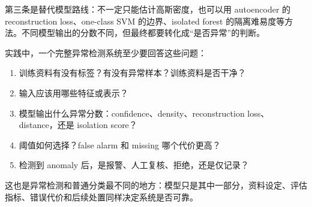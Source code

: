 \documentclass[a4paper]{article}
\begin{document}
第三条是替代模型路线：不一定只能估计高斯密度，也可以用 autoencoder 的 reconstruction loss、one-class SVM 的边界、isolated forest 的隔离难易度等方法。不同模型输出的分数不同，但最终都要转化成“是否异常”的判断。

实践中，一个完整异常检测系统至少要回答这些问题：
\begin{enumerate}
    \item 训练资料有没有标签？有没有异常样本？训练资料是否干净？
    \item 输入应该用哪些特征或表示？
    \item 模型输出什么异常分数：confidence、density、reconstruction loss、distance，还是 isolation score？
    \item 阈值如何选择？false alarm 和 missing 哪个代价更高？
    \item 检测到 anomaly 后，是报警、人工复核、拒绝，还是仅记录？
\end{enumerate}

这也是异常检测和普通分类最不同的地方：模型只是其中一部分，资料设定、评估指标、错误代价和后续处置同样决定系统是否可靠。
\end{document}
